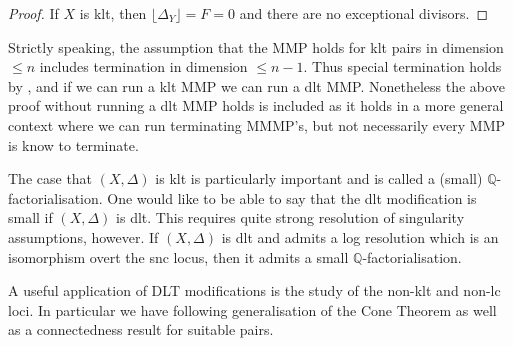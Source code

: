 \documentclass[a4paper,12pt]{book}
\begin{document}
\begin{proof}
	If $X$ is klt, then $\lfloor\Delta_{Y}\rfloor=F=0$ and there are no exceptional divisors.
\end{proof}

\begin{remark}
	Strictly speaking, the assumption that the MMP holds for klt pairs in dimension $\leq n$ includes termination in dimension $\leq n-1$. Thus special termination holds by \cite{fujino2007special} \cite[Theorem 9.7]{bhatt2020}, and if we can run a klt MMP we can run a dlt MMP. Nonetheless the above proof without running a dlt MMP holds is included as it holds in a more general context where we can run terminating MMMP's, but not necessarily every MMP is know to terminate.
	\end{remark}

The case that $(X,\Delta)$ is klt is particularly important and is called a (small) $\mathbb{Q}$-factorialisation. One would like to be able to say that the dlt modification is small if $(X,\Delta)$ is dlt. This requires quite strong resolution of singularity assumptions, however. If $(X,\Delta)$ is dlt and admits a log resolution which is an isomorphism overt the snc locus, then it admits a small $\mathbb{Q}$-factorialisation.

A useful application of DLT modifications is the study of the non-klt and non-lc loci. In particular we have following generalisation of the Cone Theorem as well as a connectedness result for suitable pairs.
\end{document}
